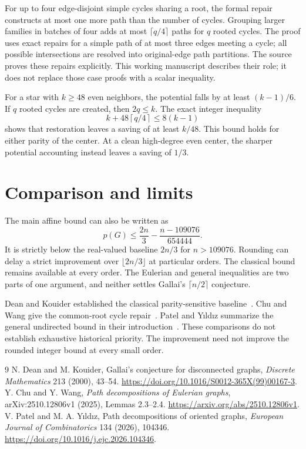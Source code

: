 \documentclass[11pt]{article}
\begin{document}
For up to four edge-disjoint simple cycles sharing a root, the formal repair constructs at most one more path than the number of cycles. Grouping larger families in batches of four adds at most $\lceil q/4\rceil$ paths for $q$ rooted cycles. The proof uses exact repairs for a simple path of at most three edges meeting a cycle; all possible intersections are resolved into original-edge path partitions. The source proves these repairs explicitly. This working manuscript describes their role; it does not replace those case proofs with a scalar inequality.

For a star with $k\geq48$ even neighbors, the potential falls by at least $(k-1)/6$. If $q$ rooted cycles are created, then $2q\leq k$. The exact integer inequality
\[
 k+48\left\lceil q/4\right\rceil\leq8(k-1)
\]
shows that restoration leaves a saving of at least $k/48$. This bound holds for either parity of the center. At a clean high-degree even center, the sharper potential accounting instead leaves a saving of $1/3$.

\section{Comparison and limits}
The main affine bound can also be written as
\[
 p(G)\leq\frac{2n}{3}-\frac{n-109076}{654444}.
\]
It is strictly below the real-valued baseline $2n/3$ for $n>109076$. Rounding can delay a strict improvement over $\lfloor2n/3\rfloor$ at particular orders. The classical bound remains available at every order. The Eulerian and general inequalities are two parts of one argument, and neither settles Gallai's $\lceil n/2\rceil$ conjecture.

Dean and Kouider established the classical parity-sensitive baseline~\cite{dk}. Chu and Wang give the common-root cycle repair~\cite{cw}. Patel and Y\i ld\i z summarize the general undirected bound in their introduction~\cite{py}. These comparisons do not establish exhaustive historical priority. The improvement need not improve the rounded integer bound at every small order.
\begin{thebibliography}{9}
 N. Dean and M. Kouider, Gallai's conjecture for disconnected graphs, \emph{Discrete Mathematics} 213 (2000), 43--54. \url{https://doi.org/10.1016/S0012-365X(99)00167-3}.
 Y. Chu and Y. Wang, \emph{Path decompositions of Eulerian graphs}, arXiv:2510.12806v1 (2025), Lemmas 2.3--2.4. \url{https://arxiv.org/abs/2510.12806v1}.
 V. Patel and M. A. Y\i ld\i z, Path decompositions of oriented graphs, \emph{European Journal of Combinatorics} 134 (2026), 104346. \url{https://doi.org/10.1016/j.ejc.2026.104346}.
\end{thebibliography}
\end{document}
